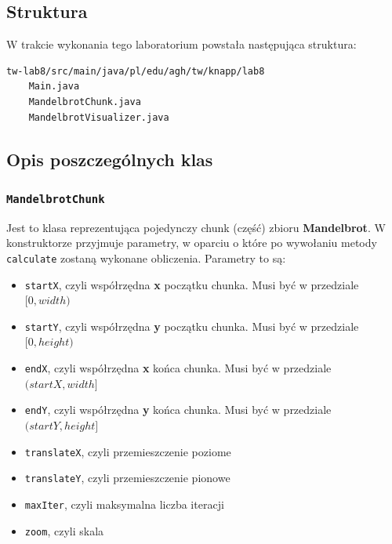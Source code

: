 \documentclass[11pt]{article}
\providecommand{\tightlist}{%
      \setlength{\itemsep}{0pt}\setlength{\parskip}{0pt}}
\begin{document}
    \hypertarget{struktura}{%
\subsection{Struktura}\label{struktura}}

W trakcie wykonania tego laboratorium powstała następująca struktura:

\begin{verbatim}
tw-lab8/src/main/java/pl/edu/agh/tw/knapp/lab8
    Main.java
    MandelbrotChunk.java
    MandelbrotVisualizer.java
\end{verbatim}

    \hypertarget{opis-poszczeguxf3lnych-klas}{%
\subsection{Opis poszczególnych
klas}\label{opis-poszczeguxf3lnych-klas}}

    \hypertarget{mandelbrotchunk}{%
\subsubsection{\texorpdfstring{\texttt{MandelbrotChunk}}{MandelbrotChunk}}\label{mandelbrotchunk}}

Jest to klasa reprezentująca pojedynczy chunk (część) zbioru
\textbf{Mandelbrot}. W konstruktorze przyjmuje parametry, w oparciu o
które po wywołaniu metody \texttt{calculate} zostaną wykonane
obliczenia. Parametry to są:

\begin{itemize}
\tightlist
\item
  \texttt{startX}, czyli współrzędna \textbf{x} początku chunka. Musi
  być w przedziale \([0, width)\)
\item
  \texttt{startY}, czyli współrzędna \textbf{y} początku chunka. Musi
  być w przedziale \([0, height)\)
\item
  \texttt{endX}, czyli współrzędna \textbf{x} końca chunka. Musi być w
  przedziale \((startX, width]\)
\item
  \texttt{endY}, czyli współrzędna \textbf{y} końca chunka. Musi być w
  przedziale \((startY, height]\)
\item
  \texttt{translateX}, czyli przemieszczenie poziome
\item
  \texttt{translateY}, czyli przemieszczenie pionowe
\item
  \texttt{maxIter}, czyli maksymalna liczba iteracji
\item
  \texttt{zoom}, czyli skala
\end{itemize}
\end{document}
